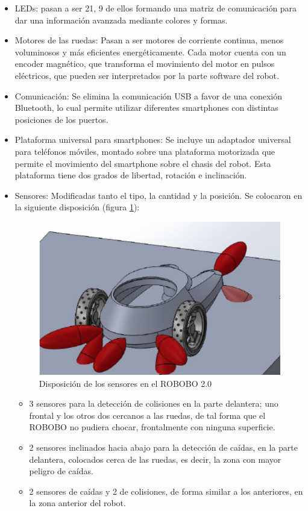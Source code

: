\begin{itemize}	

	\item LEDs: pasan a ser 21, 9 de ellos formando una matriz de comunicación para dar una información avanzada mediante colores y formas.
	\item Motores de las ruedas: Pasan a ser motores de corriente continua, menos voluminosos y más eficientes energéticamente. Cada motor cuenta con un encoder magnético, que transforma el movimiento del motor en pulsos eléctricos, que pueden ser interpretados por la parte software del robot.
	\item Comunicación: Se elimina la comunicación USB a favor de una conexión Bluetooth, lo cual permite utilizar diferentes smartphones con distintas posiciones de los puertos.
	\item Plataforma universal para smartphones: Se incluye un adaptador universal para teléfonos móviles, montado sobre una plataforma motorizada que permite el movimiento del smartphone sobre el chasis del robot. Esta plataforma tiene dos grados de libertad, rotación e inclinación.
	\item Sensores: Modificadas tanto el tipo, la cantidad y la posición. Se colocaron en la siguiente disposición (figura \ref{fig:robobo_2_0_sensors}):
	\begin{figure}
	\centering
	\includegraphics[width=0.8\linewidth]{imagenes/robobo_2_sensors.png}
	\caption{Disposición de los sensores en el ROBOBO 2.0}
	\label{fig:robobo_2_0_sensors}
\end{figure} 
	\begin{itemize}
	\item 3 sensores para la detección de colisiones en la parte delantera; uno frontal y los otros dos cercanos a las ruedas, de tal forma que el ROBOBO no pudiera chocar, frontalmente con ninguna superficie.
	\item 2 sensores inclinados hacia abajo para la detección de caídas, en la parte delantera, colocados cerca de las ruedas, es decir, la zona con mayor peligro de caídas.
	\item 2 sensores de caídas y 2 de colisiones, de forma similar a los anteriores, en la zona anterior del robot. 
	

\end{itemize}
\end{itemize}
